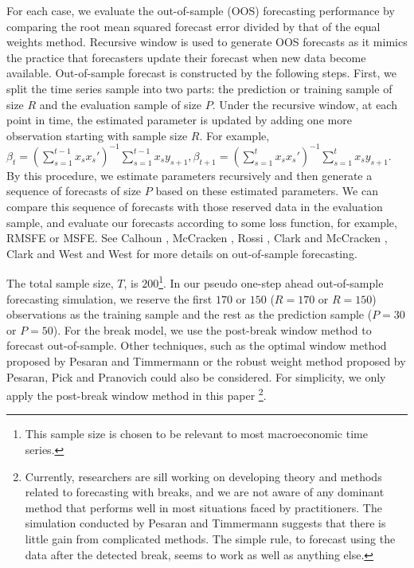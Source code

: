 For each case, we evaluate the out-of-sample (OOS) forecasting performance by comparing the root mean squared forecast error divided by that of the equal weights method. Recursive window is used to generate OOS forecasts as it mimics the practice that forecasters update their forecast when new data become available. Out-of-sample forecast is constructed by the following steps. First, we split the time series sample into two parts: the prediction or training sample of size $R$ and the evaluation sample of size $P$. Under the recursive window, at each point in time, the estimated parameter is updated by adding one more observation starting with sample size $R$. For example, $\beta_{t} = (\sum_{s=1}^{t-1} x_{s} x_{s}')^{-1}\sum_{s=1}^{t-1}x_{s}y_{s+1},\beta_{t+1} = (\sum_{s=1}^{t} x_{s} x_{s}')^{-1}\sum_{s=1}^{t}x_{s}y_{s+1}$. By this procedure, we estimate parameters recursively and then generate a sequence of forecasts of size $P$ based on these estimated parameters. We can compare this sequence of forecasts with those reserved data in the evaluation sample, and evaluate our forecasts according to some loss function, for example, RMSFE or MSFE. See Calhoun \cite{calhoun_bootstrap_2013} \cite{calhoun_overfit_2014}, McCracken \cite{mccracken_JE2000} \cite{mccracken_JE2007}, Rossi \cite{rossi_HANDBOOK2013}, Clark and McCracken \cite{clark_mccracken_JE2001} \cite{clark_mccracken_JE2005} \cite{clark_mccracken_HANDBOOK2013}, Clark and West \cite{clark_west_JE2007} and West \cite{west_HANDBOOK2006} for more details on out-of-sample forecasting.

The total sample size, $T$, is $200$\footnote{This sample size is chosen to be relevant to most macroeconomic time series.}. In our pseudo one-step ahead out-of-sample forecasting simulation, we reserve the first $170$ or $150$ ($R = 170$ or $R = 150$) observations as the training sample and the rest as the prediction sample ($P = 30$ or $P = 50$). For the break model, we use the post-break window method to forecast out-of-sample. Other techniques, such as the optimal window method proposed by Pesaran and Timmermann \cite{pesaran_timmermann_JE2007} or the robust weight method proposed by Pesaran, Pick and Pranovich \cite{pesaran_pick_pranovich_2011} could also be considered. For simplicity, we only apply the post-break window method in this paper \footnote{Currently, researchers are sill working on developing theory and methods related to forecasting with breaks, and we are not aware of any dominant method that performs well in most situations faced by practitioners. The simulation conducted by Pesaran and Timmermann suggests that there is little gain from complicated methods. The simple rule, to forecast using the data after the detected break, seems to work as well as anything else.}.

